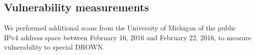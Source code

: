 \vspace{-2pt}
\subsection{Vulnerability measurements}

We performed additional scans from the University of Michigan of the public
IPv4 address space between February 16, 2016 and February 22, 2016, to measure
vulnerability to special DROWN\@. 

